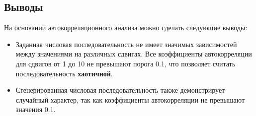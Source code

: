 \subsection{Выводы}

На основании автокорреляционного анализа можно сделать следующие выводы:
\begin{itemize}
	\item Заданная числовая последовательность не имеет значимых зависимостей между значениями на различных сдвигах. Все коэффициенты автокорреляции для сдвигов от 1 до 10 не превышают порога 0.1, что позволяет считать последовательность \textbf{хаотичной}.
	\item Сгенерированная числовая последовательность также демонстрирует случайный характер, так как коэффициенты автокорреляции не превышают значения 0.1.
\end{itemize}
